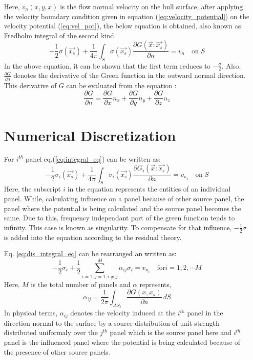 Here, $v_n(x, y, x)$ is the flow normal velocity on the hull surface, after applying the velocity boundary condition given in equation (\ref{eq:velocity_potential}) on the velocity potential (\ref{eq:vel_pot}), the below equation is obtained, also known as Fredholm integral of the second kind.
\begin{equation}
    \label{eq:integral_eq}
    -\frac{1}{2}\sigma(\vec{x_s}) + \frac{1}{4\pi}\int_S\sigma(\vec{x_s})\frac{\partial G(\vec{x}:\vec{x_s})}{\partial n} = v_n \quad \text{on}\; S
\end{equation}
In the above equation, it can be shown that the first term reduces to $-\frac{\sigma}{2}$. Also, 
$\frac{\partial G}{\partial n}$ denotes the derivative of the Green function in the outward normal direction. This derivative of $G$ can be evaluated from the equation :
\begin{equation}
    \frac{\partial G}{\partial n} = \frac{\partial G}{\partial x}n_x + \frac{\partial G}{\partial y}n_y + \frac{\partial G}{\partial z}n_z
\end{equation}

\section{Numerical Discretization}
For $i^{th}$ panel eq.(\ref{eq:integral_eq}) can be written as:
\begin{equation}
    \label{eq:dis_integral_eq}
    -\frac{1}{2}\sigma_i(\vec{x_s}) + \frac{1}{4\pi}\int_S\sigma_i(\vec{x_s})\frac{\partial G_i(\vec{x}:\vec{x_s})}{\partial n} = v_{n_i} \quad \text{on}\; S
\end{equation}
Here, the subscript $i$ in the equation represents the entities of an individual panel.
While, calculating influence on a panel because of other source panel, the panel where the potential is being calculated and the source panel becomes the same. Due to this, frequency independant part of the green function tends to infinity. This case is known as singularity. To compensate for that influence, $-\frac{1}{2}\sigma$ is added into the equation according to the residual theory.

Eq. \ref{eq:dis_integral_eq} can be rearranged an written as:
\begin{equation}
    \label{eq:alpha_int_eq}
    -\frac{1}{2}\sigma_i + \frac{1}{2}\sum_{i=1, j=1, i\ne j}^{M}\alpha_{ij}\sigma_i = v_{n_i} \quad \text{for} i = 1, 2, \cdots M
\end{equation}
Here, $M$ is the total number of panels and $\alpha$ represents, 
\begin{equation}
    \label{eq:alpha}
    \alpha_{ij} = \frac{1}{2\pi}\int_{\Delta S_i}\frac{\partial G(x, x_s)}{\partial n} \,dS
\end{equation}
In physical terms, $\alpha_{ij}$ denotes the velocity induced at the $i^{th}$ panel in the direction normal to the surface by a source distribution of unit strength distributed uniformaly over the $j^{th}$ panel which is the source panel here and $i^{th}$ panel is the influenced panel where the potential is being calculated because of the presence of other source panels.

